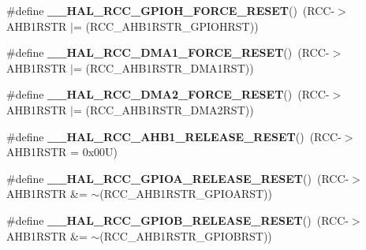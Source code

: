 \begin{DoxyCompactItemize}
\item 
\mbox{\label{group___r_c_c___a_h_b1___force___release___reset_ga4f05c575d762edf40a6d17f88671b68d}} 
\#define {\bfseries \+\_\+\+\_\+\+H\+A\+L\+\_\+\+R\+C\+C\+\_\+\+G\+P\+I\+O\+H\+\_\+\+F\+O\+R\+C\+E\+\_\+\+R\+E\+S\+ET}()~(R\+CC-\/$>$A\+H\+B1\+R\+S\+TR $\vert$= (R\+C\+C\+\_\+\+A\+H\+B1\+R\+S\+T\+R\+\_\+\+G\+P\+I\+O\+H\+R\+ST))
\item 
\mbox{\label{group___r_c_c___a_h_b1___force___release___reset_ga9135dece327ecc27f333f86dcf3ba8ee}} 
\#define {\bfseries \+\_\+\+\_\+\+H\+A\+L\+\_\+\+R\+C\+C\+\_\+\+D\+M\+A1\+\_\+\+F\+O\+R\+C\+E\+\_\+\+R\+E\+S\+ET}()~(R\+CC-\/$>$A\+H\+B1\+R\+S\+TR $\vert$= (R\+C\+C\+\_\+\+A\+H\+B1\+R\+S\+T\+R\+\_\+\+D\+M\+A1\+R\+ST))
\item 
\mbox{\label{group___r_c_c___a_h_b1___force___release___reset_gaf0be736e6cdebf31eeded223acc25613}} 
\#define {\bfseries \+\_\+\+\_\+\+H\+A\+L\+\_\+\+R\+C\+C\+\_\+\+D\+M\+A2\+\_\+\+F\+O\+R\+C\+E\+\_\+\+R\+E\+S\+ET}()~(R\+CC-\/$>$A\+H\+B1\+R\+S\+TR $\vert$= (R\+C\+C\+\_\+\+A\+H\+B1\+R\+S\+T\+R\+\_\+\+D\+M\+A2\+R\+ST))
\item 
\mbox{\label{group___r_c_c___a_h_b1___force___release___reset_ga23b6a1e77c4f045c29cc36a4b1e910b0}} 
\#define {\bfseries \+\_\+\+\_\+\+H\+A\+L\+\_\+\+R\+C\+C\+\_\+\+A\+H\+B1\+\_\+\+R\+E\+L\+E\+A\+S\+E\+\_\+\+R\+E\+S\+ET}()~(R\+CC-\/$>$A\+H\+B1\+R\+S\+TR = 0x00\+U)
\item 
\mbox{\label{group___r_c_c___a_h_b1___force___release___reset_gad56e47c2eacd972491f94296053d0cc3}} 
\#define {\bfseries \+\_\+\+\_\+\+H\+A\+L\+\_\+\+R\+C\+C\+\_\+\+G\+P\+I\+O\+A\+\_\+\+R\+E\+L\+E\+A\+S\+E\+\_\+\+R\+E\+S\+ET}()~(R\+CC-\/$>$A\+H\+B1\+R\+S\+TR \&= $\sim$(R\+C\+C\+\_\+\+A\+H\+B1\+R\+S\+T\+R\+\_\+\+G\+P\+I\+O\+A\+R\+ST))
\item 
\mbox{\label{group___r_c_c___a_h_b1___force___release___reset_gaf03da3b36478071844fbd77df618a686}} 
\#define {\bfseries \+\_\+\+\_\+\+H\+A\+L\+\_\+\+R\+C\+C\+\_\+\+G\+P\+I\+O\+B\+\_\+\+R\+E\+L\+E\+A\+S\+E\+\_\+\+R\+E\+S\+ET}()~(R\+CC-\/$>$A\+H\+B1\+R\+S\+TR \&= $\sim$(R\+C\+C\+\_\+\+A\+H\+B1\+R\+S\+T\+R\+\_\+\+G\+P\+I\+O\+B\+R\+ST))

\end{DoxyCompactItemize}
